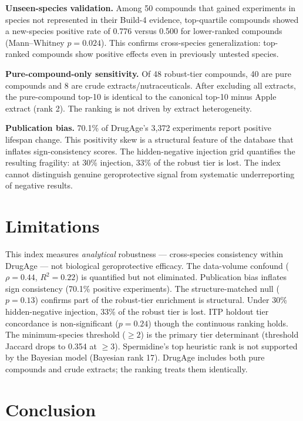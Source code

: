 \documentclass[10pt]{article}
\begin{document}
\textbf{Unseen-species validation.} Among 50 compounds that gained experiments in species not represented in their Build-4 evidence, top-quartile compounds showed a new-species positive rate of 0.776 versus 0.500 for lower-ranked compounds (Mann--Whitney $p = 0.024$). This confirms cross-species generalization: top-ranked compounds show positive effects even in previously untested species.

\textbf{Pure-compound-only sensitivity.} Of 48 robust-tier compounds, 40 are pure compounds and 8 are crude extracts/nutraceuticals. After excluding all extracts, the pure-compound top-10 is identical to the canonical top-10 minus Apple extract (rank 2). The ranking is not driven by extract heterogeneity.

\textbf{Publication bias.} 70.1\% of DrugAge's 3{,}372 experiments report positive lifespan change. This positivity skew is a structural feature of the database that inflates sign-consistency scores. The hidden-negative injection grid quantifies the resulting fragility: at 30\% injection, 33\% of the robust tier is lost. The index cannot distinguish genuine geroprotective signal from systematic underreporting of negative results.

\section{Limitations}

This index measures \emph{analytical} robustness --- cross-species consistency within DrugAge --- not biological geroprotective efficacy. The data-volume confound ($\rho = 0.44$, $R^2 = 0.22$) is quantified but not eliminated. Publication bias inflates sign consistency (70.1\% positive experiments). The structure-matched null ($p = 0.13$) confirms part of the robust-tier enrichment is structural. Under 30\% hidden-negative injection, 33\% of the robust tier is lost. ITP holdout tier concordance is non-significant ($p = 0.24$) though the continuous ranking holds. The minimum-species threshold ($\geq 2$) is the primary tier determinant (threshold Jaccard drops to 0.354 at $\geq 3$). Spermidine's top heuristic rank is not supported by the Bayesian model (Bayesian rank 17). DrugAge includes both pure compounds and crude extracts; the ranking treats them identically.

\section{Conclusion}
\end{document}
